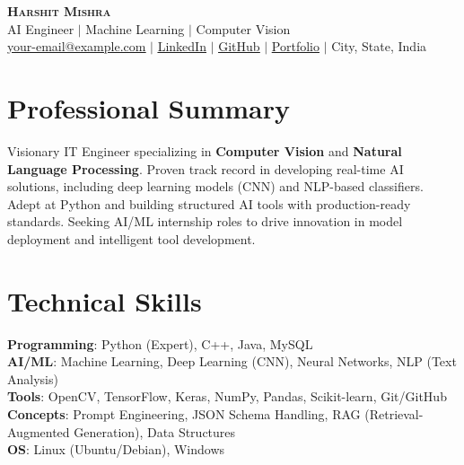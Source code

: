 \documentclass[letterpaper,11pt]{article}
\begin{document}
\begin{center}
    \textbf{\Huge \scshape Harshit Mishra} \\ \vspace{1pt}
    \small AI Engineer $|$ Machine Learning $|$ Computer Vision \\ \vspace{1pt}
    \small \href{mailto:your-email@example.com}{\underline{your-email@example.com}} $|$ 
    \href{https://www.linkedin.com/in/harshit-mishra-51275b219/}{\underline{LinkedIn}} $|$
    \href{https://github.com/harshit-001-it}{\underline{GitHub}} $|$
    \href{https://harshit-001-it.github.io/Personal-Portfolio-Website/}{\underline{Portfolio}} $|$
    \small City, State, India
\end{center}

\section{Professional Summary}
Visionary IT Engineer specializing in \textbf{Computer Vision} and \textbf{Natural Language Processing}. Proven track record in developing real-time AI solutions, including deep learning models (CNN) and NLP-based classifiers. Adept at Python and building structured AI tools with production-ready standards. Seeking AI/ML internship roles to drive innovation in model deployment and intelligent tool development.


\section{Technical Skills}
 \begin{itemize}[leftmargin=0.15in, label={}]
    \small{\item{
     \textbf{Programming}{: Python (Expert), C++, Java, MySQL} \\
     \textbf{AI/ML}{: Machine Learning, Deep Learning (CNN), Neural Networks, NLP (Text Analysis)} \\
     \textbf{Tools}{: OpenCV, TensorFlow, Keras, NumPy, Pandas, Scikit-learn, Git/GitHub} \\
     \textbf{Concepts}{: Prompt Engineering, JSON Schema Handling, RAG (Retrieval-Augmented Generation), Data Structures} \\
     \textbf{OS}{: Linux (Ubuntu/Debian), Windows}
    }}
 \end{itemize}
\end{document}
